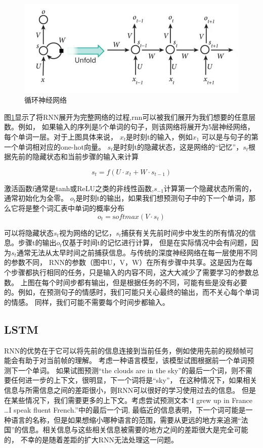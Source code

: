 \begin{figure}[htbp]
  \centering
  \includegraphics[scale=0.5]{./images/rnn.jpg}
  \caption{循环神经网络}
  \label{fig:rnn}
\end{figure}

图\ref{fig:rnn}显示了将RNN展开为完整网络的过程,rnn可以被我们展开为我们想要的任意层数。例如，
如果输入的序列是5个单词的句子，则该网络将展开为5层神经网络，每个单词一层。对于上图具体来说，
$x_{t}$是时刻t的输入，例如$x_{1}$ 可以是与句子的第一个单词相对应的one-hot向量。
$s_{t}$是时刻t的隐藏状态，这是网络的“记忆”，$s_{t}$根据先前的隐藏状态和当前步骤的输入来计算

\begin{equation}
  s_{t}=f(U \cdot x_{t}+W \cdot s_{t-1})
  \end{equation}

激活函数f通常是tanh或ReLU之类的非线性函数,$s_{-1}$计算第一个隐藏状态所需的，通常初始化为全零。
$o_{t}$是时刻t的输出，如果我们想预测句子中的下一个单词，那么它将是整个词汇表中单词的概率分布
\begin{equation}
  o_t = \mathrm softmax (V \cdot s_t)
  \end{equation}

  可以将隐藏状态$s_{t}$视为网络的记忆，$s_{t}$捕获有关先前时间步中发生的所有情况的信息。步骤t的输出$o_{t}$仅基于时间t的记忆进行计算，
  但是在实际情况中会有问题，因为$s_{t}$通常无法从太早时间之前捕获信息。与传统的深度神经网络在每一层使用不同的参数不同，
  RNN的参数（图中U，V，W）在所有步骤中共享。这是因为在每个步骤都执行相同的任务，只是输入的内容不同，这大大减少了需要学习的参数总数。
  上图在每个时间步都有输出，但是根据任务的不同，可能有些是没有必要的。例如，在预测句子的情感时，我们可能只关心最终的输出，而不关心每个单词的情感。
  同样，我们可能不需要每个时间步都输入。

  
\subsection{LSTM}
  RNN的优势在于它可以将先前的信息连接到当前任务，例如使用先前的视频帧可能会有助于对当前帧的理解。
  考虑一种语言模型，该模型试图根据前一个单词预测下一个单词。
  如果试图预测“the clouds are in the sky”的最后一个词，则不需要任何进一步的上下文，很明显，下一个词将是“sky”，
  在这种情况下，如果相关信息与所需信息之间的差距很小，则RNN可以很好的学习使用过去的信息。
  但是在某些情况下，我们需要更多的上下文。考虑尝试预测文本“I grew up in France \dots I speak fluent French.”中的最后一个词,
  最临近的信息表明，下一个词可能是一种语言的名称，但是如果想缩小哪种语言的范围，需要从更远的地方来追溯“法国”的信息。相关信息与这些相关信息被需要的地方之间的差距很大是完全可能的，
不幸的是随着差距的扩大RNN无法处理这一问题。

